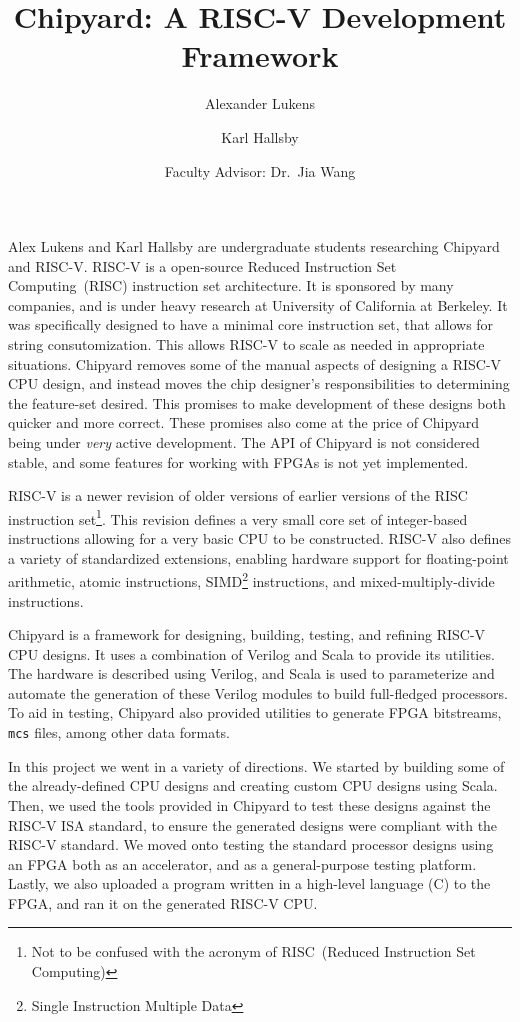 \documentclass[10pt,letterpaper,final,twoside,notitlepage]{article}
\title{Chipyard: A RISC-V Development Framework}
\author{Alexander Lukens \and Karl Hallsby \and Faculty Advisor: Dr.\ Jia Wang}
\date{\DTMdisplaydate{2021}{4}{9}{-1}} %
\begin{document}
\maketitle
{} %

\nocite{chipyard}

Alex Lukens and Karl Hallsby are undergraduate students researching Chipyard~\cite{chipyard} and RISC-V.
RISC-V is a open-source Reduced Instruction Set Computing~(RISC) instruction set architecture.
It is sponsored by many companies, and is under heavy research at University of California at Berkeley.
It was specifically designed to have a minimal core instruction set, that allows for string consutomization.
This allows RISC-V to scale as needed in appropriate situations.
Chipyard removes some of the manual aspects of designing a RISC-V CPU design, and instead moves the chip designer's responsibilities to determining the feature-set desired.
This promises to make development of these designs both quicker and more correct.
These promises also come at the price of Chipyard being under \emph{very} active development.
The API of Chipyard is not considered stable, and some features for working with FPGAs is not yet implemented.

RISC-V is a newer revision of older versions of earlier versions of the RISC instruction set\footnote{Not to be confused with the acronym of RISC~(Reduced Instruction Set Computing)}.
This revision defines a very small core set of integer-based instructions allowing for a very basic CPU to be constructed.
RISC-V also defines a variety of standardized extensions, enabling hardware support for floating-point arithmetic, atomic instructions, SIMD\footnote{Single Instruction Multiple Data} instructions, and mixed-multiply-divide instructions.

Chipyard is a framework for designing, building, testing, and refining RISC-V CPU designs.
It uses a combination of Verilog and Scala to provide its utilities.
The hardware is described using Verilog, and Scala is used to parameterize and automate the generation of these Verilog modules to build full-fledged processors.
To aid in testing, Chipyard also provided utilities to generate FPGA bitstreams, \texttt{mcs} files, among other data formats.

In this project we went in a variety of directions.
We started by building some of the already-defined CPU designs and creating custom CPU designs using Scala.
Then, we used the tools provided in Chipyard to test these designs against the RISC-V ISA standard, to ensure the generated designs were compliant with the RISC-V standard.
We moved onto testing the standard processor designs using an FPGA both as an accelerator, and as a general-purpose testing platform.
Lastly, we also uploaded a program written in a high-level language (C) to the FPGA, and ran it on the generated RISC-V CPU.\@

\printbibliography[heading=bibintoc]{}
\end{document}
